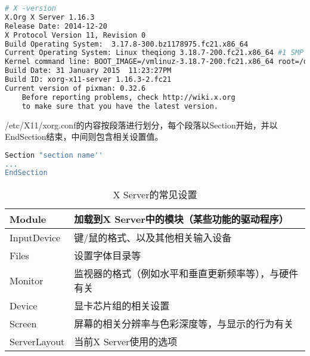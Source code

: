 \begin{lstlisting}[language=bash]
# X -version
X.Org X Server 1.16.3
Release Date: 2014-12-20
X Protocol Version 11, Revision 0
Build Operating System:  3.17.8-300.bz1178975.fc21.x86_64 
Current Operating System: Linux theqiong 3.18.7-200.fc21.x86_64 #1 SMP Wed Feb 11 21:53:17 UTC 2015 x86_64
Kernel command line: BOOT_IMAGE=/vmlinuz-3.18.7-200.fc21.x86_64 root=/dev/mapper/fedora_theqiong-root ro rd.lvm.lv=fedora_theqiong/swap rd.lvm.lv=fedora_theqiong/root rhgb quiet LANG=en_US.UTF-8
Build Date: 31 January 2015  11:23:27PM
Build ID: xorg-x11-server 1.16.3-2.fc21 
Current version of pixman: 0.32.6
	Before reporting problems, check http://wiki.x.org
	to make sure that you have the latest version.
\end{lstlisting}

/etc/X11/xorg.conf的内容按段落进行划分，每个段落以Section开始，并以EndSection结束，中间则包含相关设置值。

\begin{lstlisting}[language=bash]
Section "section name''
...
EndSection
\end{lstlisting}

\begin{table}[htbp]
\centering
\caption{X Server的常见设置}
\begin{tabular}{|l|l|}
\hline
Module & 加载到X Server中的模块（某些功能的驱动程序）\\
\hline
InputDevice& 键/鼠的格式、以及其他相关输入设备\\
\hline
Files & 设置字体目录等\\
\hline
Monitor & 监视器的格式（例如水平和垂直更新频率等），与硬件有关\\
\hline
Device & 显卡芯片组的相关设置\\
\hline
Screen & 屏幕的相关分辨率与色彩深度等，与显示的行为有关\\
\hline
ServerLayout & 当前X Server使用的选项\\
\hline
\end{tabular}
\end{table}


